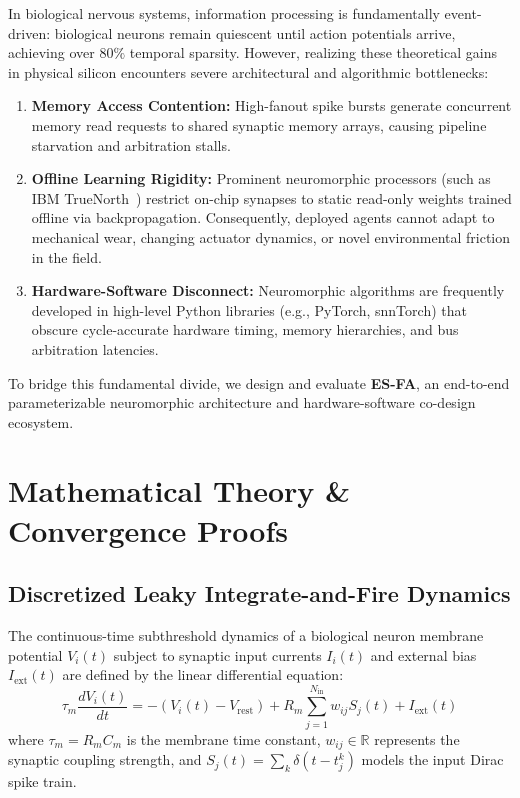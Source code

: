 \documentclass[journal]{IEEEtran}
\theoremstyle{definition}
\begin{document}
In biological nervous systems, information processing is fundamentally event-driven: biological neurons remain quiescent until action potentials arrive, achieving over $80\%$ temporal sparsity. However, realizing these theoretical gains in physical silicon encounters severe architectural and algorithmic bottlenecks:
\begin{enumerate}
    \item \textbf{Memory Access Contention:} High-fanout spike bursts generate concurrent memory read requests to shared synaptic memory arrays, causing pipeline starvation and arbitration stalls.
    \item \textbf{Offline Learning Rigidity:} Prominent neuromorphic processors (such as IBM TrueNorth~\cite{merolla2014}) restrict on-chip synapses to static read-only weights trained offline via backpropagation. Consequently, deployed agents cannot adapt to mechanical wear, changing actuator dynamics, or novel environmental friction in the field.
    \item \textbf{Hardware-Software Disconnect:} Neuromorphic algorithms are frequently developed in high-level Python libraries (e.g., PyTorch, snnTorch) that obscure cycle-accurate hardware timing, memory hierarchies, and bus arbitration latencies.
\end{enumerate}

To bridge this fundamental divide, we design and evaluate \textbf{ES-FA}, an end-to-end parameterizable neuromorphic architecture and hardware-software co-design ecosystem.

\section{Mathematical Theory \& Convergence Proofs}
\subsection{Discretized Leaky Integrate-and-Fire Dynamics}
The continuous-time subthreshold dynamics of a biological neuron membrane potential $V_i(t)$ subject to synaptic input currents $I_i(t)$ and external bias $I_{\text{ext}}(t)$ are defined by the linear differential equation:
\begin{equation}
\tau_m \frac{dV_i(t)}{dt} = -(V_i(t) - V_{\text{rest}}) + R_m \sum_{j=1}^{N_{\text{in}}} w_{ij} S_j(t) + I_{\text{ext}}(t)
\label{eq:lif_cont}
\end{equation}
where $\tau_m = R_m C_m$ is the membrane time constant, $w_{ij} \in \mathbb{R}$ represents the synaptic coupling strength, and $S_j(t) = \sum_k \delta(t - t_j^k)$ models the input Dirac spike train.
\end{document}
